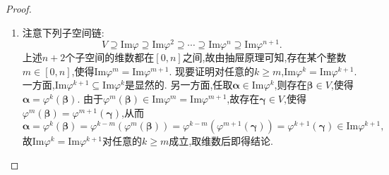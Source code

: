 \documentclass[../../main.tex]{subfiles}%
\begin{document}
\begin{proof}
\begin{enumerate}[(1)]
{\color{blue}证法二(几何方法):} 令\(\varphi\)为在\(n\)维列向量空间上由矩阵\(\boldsymbol{A}\)乘法诱导的线性变换,则\(\varphi\)在标准基下的表示矩阵就是\(\boldsymbol{A}\),并且不难发现对\(\forall k\in \mathbb{N}\),\(\varphi^k\)在标准基下的表示矩阵是\(\boldsymbol{A}^k\).因此\(\mathrm{r}(\boldsymbol{A}^k) = \mathrm{dim} \,\mathrm{Im}\varphi^k\),故原命题等价于$\mathrm{dim}\,\mathrm{Im}\varphi ^n=\mathrm{dim}\,\mathrm{Im}\varphi ^{n+1}=\mathrm{dim}\,\mathrm{Im}\varphi ^{n+2}=\cdots 
$.注意下列子空间链:
\[
V\supseteq\text{Im}\varphi\supseteq\text{Im}\varphi^2\supseteq\cdots\supseteq\text{Im}\varphi^n\supseteq\text{Im}\varphi^{n + 1}.
\]
上述\(n + 2\)个子空间的维数都在\([0,n]\)之间,故由抽屉原理可知,存在某个整数\(m\in[0,n]\),使得\(\text{Im}\varphi^m=\text{Im}\varphi^{m + 1}\). 现要证明对任意的\(k\geqslant  m\),\(\text{Im}\varphi^k=\text{Im}\varphi^{k + 1}\). 一方面,\(\text{Im}\varphi^{k + 1}\subseteq\text{Im}\varphi^k\)是显然的. 另一方面,任取\(\boldsymbol{\alpha}\in\text{Im}\varphi^k\),则存在\(\boldsymbol{\beta}\in V\),使得\(\boldsymbol{\alpha}=\varphi^k(\boldsymbol{\beta})\). 由于\(\varphi^m(\boldsymbol{\beta})\in\text{Im}\varphi^m=\text{Im}\varphi^{m + 1}\),故存在\(\boldsymbol{\gamma}\in V\),使得\(\varphi^m(\boldsymbol{\beta})=\varphi^{m + 1}(\boldsymbol{\gamma})\),从而
\[
\boldsymbol{\alpha}=\varphi^k(\boldsymbol{\beta})=\varphi^{k - m}(\varphi^m(\boldsymbol{\beta}))=\varphi^{k - m}(\varphi^{m + 1}(\boldsymbol{\gamma}))=\varphi^{k + 1}(\boldsymbol{\gamma})\in\text{Im}\varphi^{k + 1},
\]
故\(\text{Im}\varphi^k=\text{Im}\varphi^{k + 1}\)对任意的\(k\geqslant  m\)成立,取维数后即得结论. 

\item 注意下列子空间链:
\[
V\supseteq\text{Im}\varphi\supseteq\text{Im}\varphi^2\supseteq\cdots\supseteq\text{Im}\varphi^n\supseteq\text{Im}\varphi^{n + 1}.
\]
上述\(n + 2\)个子空间的维数都在\([0,n]\)之间,故由抽屉原理可知,存在某个整数\(m\in[0,n]\),使得\(\text{Im}\varphi^m=\text{Im}\varphi^{m + 1}\). 现要证明对任意的\(k\geqslant  m\),\(\text{Im}\varphi^k=\text{Im}\varphi^{k + 1}\). 一方面,\(\text{Im}\varphi^{k + 1}\subseteq\text{Im}\varphi^k\)是显然的. 另一方面,任取\(\boldsymbol{\alpha}\in\text{Im}\varphi^k\),则存在\(\boldsymbol{\beta}\in V\),使得\(\boldsymbol{\alpha}=\varphi^k(\boldsymbol{\beta})\). 由于\(\varphi^m(\boldsymbol{\beta})\in\text{Im}\varphi^m=\text{Im}\varphi^{m + 1}\),故存在\(\boldsymbol{\gamma}\in V\),使得\(\varphi^m(\boldsymbol{\beta})=\varphi^{m + 1}(\boldsymbol{\gamma})\),从而
\[
\boldsymbol{\alpha}=\varphi^k(\boldsymbol{\beta})=\varphi^{k - m}(\varphi^m(\boldsymbol{\beta}))=\varphi^{k - m}(\varphi^{m + 1}(\boldsymbol{\gamma}))=\varphi^{k + 1}(\boldsymbol{\gamma})\in\text{Im}\varphi^{k + 1},
\]
故\(\text{Im}\varphi^k=\text{Im}\varphi^{k + 1}\)对任意的\(k\geqslant  m\)成立,取维数后即得结论. 
\end{enumerate}
\end{proof}
\end{document}
